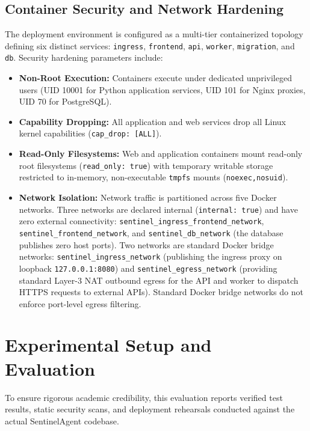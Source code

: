 \documentclass[conference]{IEEEtran}
\begin{document}
\subsection{Container Security and Network Hardening}
The deployment environment is configured as a multi-tier containerized topology defining six distinct services: \texttt{ingress}, \texttt{frontend}, \texttt{api}, \texttt{worker}, \texttt{migration}, and \texttt{db}. Security hardening parameters include:
\begin{itemize}
    \item \textbf{Non-Root Execution:} Containers execute under dedicated unprivileged users (UID 10001 for Python application services, UID 101 for Nginx proxies, UID 70 for PostgreSQL).
    \item \textbf{Capability Dropping:} All application and web services drop all Linux kernel capabilities (\texttt{cap\_drop: [ALL]}).
    \item \textbf{Read-Only Filesystems:} Web and application containers mount read-only root filesystems (\texttt{read\_only: true}) with temporary writable storage restricted to in-memory, non-executable \texttt{tmpfs} mounts (\texttt{noexec,nosuid}).
    \item \textbf{Network Isolation:} Network traffic is partitioned across five Docker networks. Three networks are declared internal (\texttt{internal: true}) and have zero external connectivity: \texttt{sentinel\_ingress\_frontend\_network}, \texttt{sentinel\_frontend\_network}, and \texttt{sentinel\_db\_network} (the database publishes zero host ports). Two networks are standard Docker bridge networks: \texttt{sentinel\_ingress\_network} (publishing the ingress proxy on loopback \texttt{127.0.0.1:8080}) and \texttt{sentinel\_egress\_network} (providing standard Layer-3 NAT outbound egress for the API and worker to dispatch HTTPS requests to external APIs). Standard Docker bridge networks do not enforce port-level egress filtering.
\end{itemize}

\section{Experimental Setup and Evaluation}
To ensure rigorous academic credibility, this evaluation reports verified test results, static security scans, and deployment rehearsals conducted against the actual SentinelAgent codebase.
\end{document}
